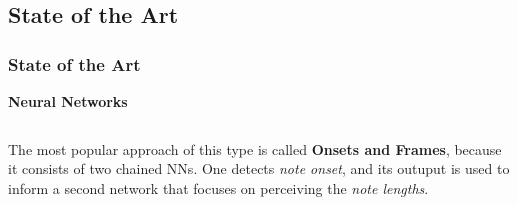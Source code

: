 \documentclass{beamer}
\newcommand{\emp}[1]{\textcolor{tum}{\textbf{#1}}}
\begin{document}
\subsection{State of the Art}
\begin{frame}[allowframebreaks]
	\frametitle{State of the Art}

	\emp{Neural Networks} %



	\begin{columns}
		\begin{column}{0.4\textwidth}
			The most popular approach of this type is called \textbf{Onsets and Frames}, because it consists of two chained NNs. One detects \textit{note onset}, and its outuput is used to inform a second network that focuses on perceiving the \textit{note lengths}.
		\end{column}


\end{columns}
\end{frame}
\end{document}
